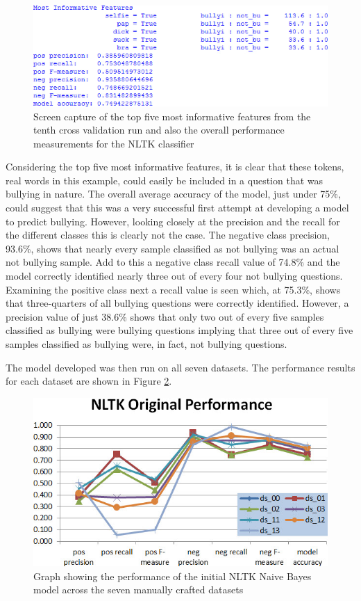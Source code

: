 \begin{figure}[htbp]
	\centering
	\includegraphics[width=.85\textwidth]{Figures/Chapter5/nltk_process_results_01.jpg}
	\caption[Performance measurements for initial NLTK classifier]{Screen capture of the top five most informative features from the tenth cross validation run and also the overall performance measurements for the NLTK classifier}
	\label{fig:nltk_process_results_01}
\end{figure}

Considering the top five most informative features, it is clear that these tokens, real words in this example, could easily be included in a question that was bullying in nature. The overall average accuracy of the model, just under 75\%, could suggest that this was a very successful first attempt at developing a model to predict bullying. However, looking closely at the precision and the recall for the different classes this is clearly not the case. The negative class precision, 93.6\%,  shows that nearly every sample classified as not bullying was an actual not bullying sample. Add to this a negative class recall value of 74.8\% and the model correctly identified nearly three out of every four not bullying questions. Examining the positive class next a recall value is seen which, at 75.3\%, shows that three-quarters of all bullying questions were correctly identified. However, a precision value of just 38.6\% shows that only two out of every five samples classified as bullying were  bullying questions implying that three out of every five samples classified as bullying were, in fact, not bullying questions. 

The model developed was then run on all seven datasets. The performance results for each dataset are shown in Figure \ref{fig:nltk_process_chart_01}.

\begin{figure}[htbp]
	\centering
	\includegraphics[width=.75\textwidth]{Figures/Chapter5/nltk_process_chart_01.jpg}
	\caption[Initial NLTK model performance across datasets]{Graph showing the performance of the initial NLTK Naive Bayes model across the seven manually crafted datasets}
	\label{fig:nltk_process_chart_01}
\end{figure}

